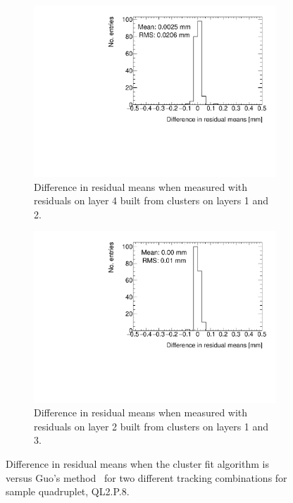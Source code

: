 \begin{figure}
  \centering
    \begin{subfigure}{.45\textwidth}
      \centering
      \includegraphics[width=\linewidth]{figures/compare_residual_fits_QL2P08_3100V_2021-06-18_no_dnl_minus_QL2P08_3100V_2021-07-21_no_reclustering_layer4_fixedlayers12.pdf}
      \caption{Difference in residual means when measured with residuals on layer 4 built from clusters on layers 1 and 2.}
      \label{fig:cluster_fit_res_mean_compare_fits_412}
    \end{subfigure}\hfill
    \begin{subfigure}{.45\textwidth}
      \centering
      \includegraphics[width=\linewidth]{figures/figure_compare_residual_fits_QL2P08_3100V_2021-06-18_no_dnl_minus_QL2P08_3100V_2021-07-21_no_reclustering_layer2_fixedlayers13.pdf}
      \caption{Difference in residual means when measured with residuals on layer 2 built from clusters on layers 1 and 3.}
      \label{fig:cluster_fit_res_mean_compare_fits_213}
    \end{subfigure}\hfill
  \caption{Difference in residual means when the cluster fit algorithm is ~\cite{hatlo_developments_2005} versus Guo's method~\cite{guo_simple_2011} for two different tracking combinations for sample quadruplet, QL2.P.8.}
  \label{fig:cluster_fit_res_mean_compare_fits}
\end{figure}

